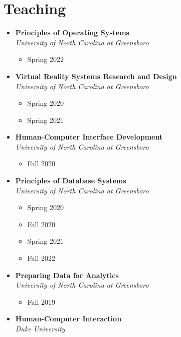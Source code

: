\documentclass[wideaddress]{vitae}
\begin{document}
\section{Teaching}
\begin{itemize}
        \item \textbf{Principles of Operating Systems}              					\\\textit{University of North Carolina at Greensboro}
        \begin{itemize}
            \item Spring 2022
        \end{itemize}
        \item \textbf{Virtual Reality Systems Research and Design}              		\\\textit{University of North Carolina at Greensboro}
        \begin{itemize}
            \item Spring 2020
            \item Spring 2021
        \end{itemize}
        \item \textbf{Human-Computer Interface Development}		    					\\\textit{University of North Carolina at Greensboro}
        \begin{itemize}
            \item Fall 2020
        \end{itemize}
        \item \textbf{Principles of Database Systems}              						\\\textit{University of North Carolina at Greensboro}
        \begin{itemize}
            \item Spring 2020
            \item Fall 2020
            \item Spring 2021
            \item Fall 2022
        \end{itemize}
        \item \textbf{Preparing Data for Analytics}              						\\\textit{University of North Carolina at Greensboro}
        \begin{itemize}
            \item Fall 2019
        \end{itemize}
        \item \textbf{Human-Computer Interaction} 				    					\\\textit{Duke University}

\end{itemize}
\end{document}

